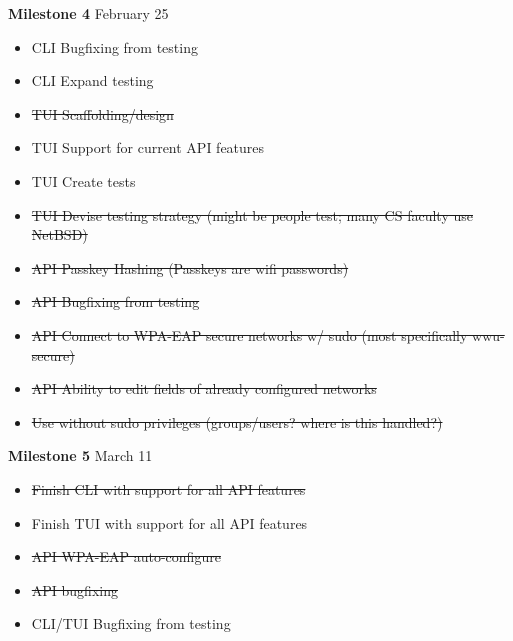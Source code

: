 \documentclass[11pt]{article}
\begin{document}
\textbf{Milestone 4} February 25
\begin{itemize}
  \item CLI Bugfixing from testing
  \item CLI Expand testing
  \item \sout{TUI Scaffolding/design}
  \item TUI Support for current API features
  \item TUI Create tests
  \item \sout{TUI Devise testing strategy (might be people test; many CS faculty use NetBSD)}
  \item\sout{API Passkey Hashing (Passkeys are wifi passwords)}
  \item\sout{API Bugfixing from testing}
  \item\sout{API Connect to WPA-EAP secure networks w/ sudo (most specifically wwu-secure)}
  \item\sout{API Ability to edit fields of already configured networks}
  \item\sout{Use without sudo privileges (groups/users? where is this handled?)}
\end{itemize}

\textbf{Milestone 5} March 11
\begin{itemize}
  \item\sout{Finish CLI with support for all API features}
  \item Finish TUI with support for all API features
  \item\sout{API WPA-EAP auto-configure}
  \item\sout{API bugfixing}
  \item CLI/TUI Bugfixing from testing
\end{itemize}
\end{document}
